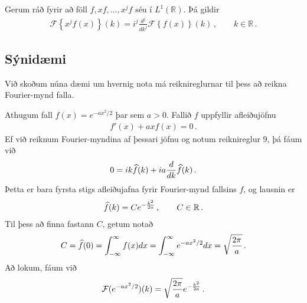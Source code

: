 \documentclass[a4paper,10pt,icelandic]{sphinxmanual}
\begin{document}
Gerum ráð fyrir að föll \(f, x f, \dots, x^j f\) séu í \(L^1(\mathbb R)\). Þá gildir
\begin{equation*}
\begin{split}\mathcal{F}\left\{x^j f(x)\right\}(k)= i^j \frac{d^j}{dk^j}\mathcal{F}\left\{f(x)\right\}(k)\,, \qquad k \in\mathbb R\,.\end{split}
\end{equation*}

\subsection{Sýnidæmi}
\label{\detokenize{Kafli04:rulesft}}\label{\detokenize{Kafli04:id1}}
Við skoðum núna dæmi um hvernig nota má reiknireglurnar til þess að reikna Fourier-mynd falla.

Athugum fall \(f(x)=e^{-a x^2/2}\) þar sem  \(a>0\). Fallið \(f\) uppfyllir afleiðujöfnu
\begin{equation*}
\begin{split}f'(x)+a x f(x)=0\,.\end{split}
\end{equation*}
Ef við reiknum Fourier-myndina af þessari jöfnu og notum reiknireglur 9, þá fáum við
\begin{equation*}
\begin{split}0= i k \widehat{f}(k)+i a {d\over dk}\widehat{f}(k)\,.\end{split}
\end{equation*}
Þetta er bara fyrsta stigs afleiðujafna fyrir Fourier-mynd fallsins \(f\), og lausnin er
\begin{equation*}
\begin{split}\widehat{f}(k)= C e^{-{k^2\over 2 a}}\,, \qquad C\in \mathbb{R}\,.\end{split}
\end{equation*}
Til þess að finna fastann \(C\), getum notað
\begin{equation*}
\begin{split}C=\widehat{f}(0)=\int_{-\infty}^{\infty} f(x) dx= \int_{-\infty}^{\infty} e^{-a x^2/2} dx= \sqrt{{2\pi}\over a}\,.\end{split}
\end{equation*}
Að lokum, fáum við
\begin{equation*}
\begin{split}\mathcal{F}(e^{-a x^2/2})(k) = \sqrt{{2\pi}\over a}e^{-{k^2\over 2 a}}\,.\end{split}
\end{equation*}
\end{document}
